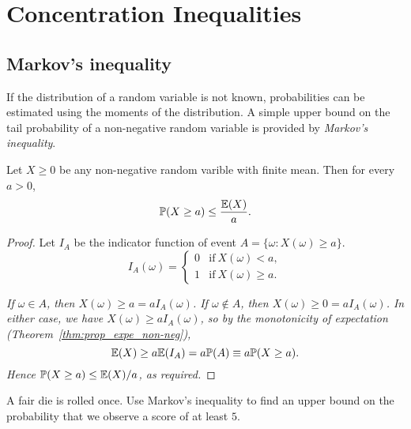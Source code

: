 \chapter{Concentration Inequalities}\label{chap:ineqs}
\section{Markov's inequality}

If the distribution of a random variable is not known, probabilities can be estimated using the moments of the distribution. A simple upper bound on the tail probability of a non-negative random variable is provided by \emph{Markov's inequality}.

\begin{theorem}
Let $X\geq 0$ be any non-negative random varible with finite mean. Then for every $a>0$,
\[
\prob(X\geq a) \leq \frac{\expe(X)}{a}.%
\]
\end{theorem}

\begin{proof}
Let $I_A$ be the indicator function of event $A = \{\omega: X(\omega)\geq a\}$. 
\[
I_A(\omega) = \left\{\begin{array}{ll} 0 & \text{if}\ X(\omega) < a, \\ 1 & \text{if}\ X(\omega)\geq a. \end{array}\right.
\]

	\bit
	\it If $\omega\in A$, then $X(\omega)   \geq a = a I_A(\omega)$.
	\it If $\omega\notin A$, then $X(\omega)\geq 0 = a I_A(\omega)$.
	\eit
In either case, we have $X(\omega)\geq a I_A(\omega)$, so by the monotonicity of expectation (Theorem~\ref{thm:prop_expe_non-neg}),
\[
\mathbb{E}(X) \geq a\mathbb{E}(I_A) = a\mathbb{P}(A) \equiv a\mathbb{P}(X\geq a).
\]
Hence $\mathbb{P}(X\geq a) \leq \mathbb{E}(X)/a$, as required.
\end{proof}

\begin{example}
A fair die is rolled once. Use Markov's inequality to find an upper bound on the probability that we observe a score of at least $5$.
\end{example}


